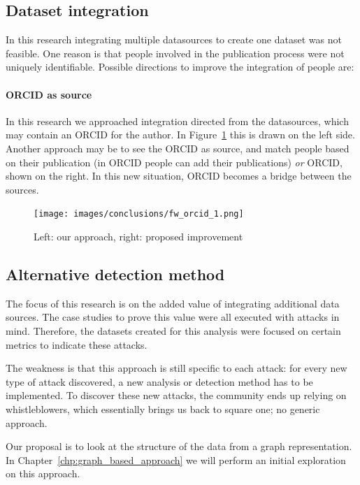 \documentclass{ou-report}
\newcommand{\todo}[1]{{\color{red} TODO: #1}}
\newcommand{\orcid}{ORCID}
\begin{document}
\subsection{Dataset integration}
In this research integrating multiple datasources to create one dataset was not
feasible. One reason is that people involved in the publication process were not
uniquely identifiable.
Possible directions to improve the integration of people are:

\paragraph{ORCID as source}
In this research we approached integration directed from the datasources, which
may contain an \orcid{} for the author. In Figure~\ref{fig:fw_orcid_1} this is 
drawn on the left side. Another approach may be to see the \orcid{}
as source, and match people based on their publication (in \orcid{} people can 
add their publications) \textit{or} \orcid{}, shown on the right. In this new
situation, \orcid{} becomes a bridge between the sources.

\begin{figure}[H]
    \centering
    \texttt{[image: images/conclusions/fw\_orcid\_1.png]}
    \caption{Left: our approach, right: proposed improvement}
    \label{fig:fw_orcid_1}
\end{figure}

\subsection{Alternative detection method}
The focus of this research is on the added value of integrating additional data 
sources. The case studies to prove this value were all executed with attacks in 
mind. Therefore, the datasets created for this analysis were focused on certain 
metrics to indicate these attacks. 

The weakness is that this approach is
still specific to each attack: for every new type of attack discovered, a new
analysis or detection method has to be implemented. 
To discover these new attacks, the community ends up relying on whistleblowers, 
which essentially brings us back to square one; no generic approach.

Our proposal is to look at the structure of the data from a graph 
representation. In Chapter~\ref{chp:graph_based_approach} we will perform an
initial exploration on this approach.

\end{document}
